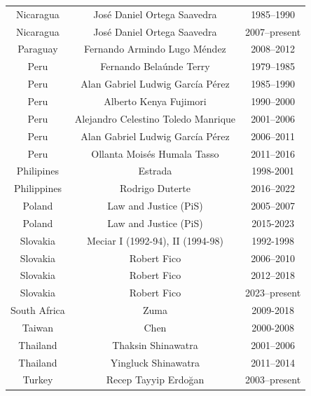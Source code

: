 \documentclass{OUP-EJ}
\begin{document}
\begin{table}[h]
{\begin{tabular}{|c|c|c|}
Nicaragua    & José Daniel Ortega Saavedra                   & 1985–1990    \\
Nicaragua    & José Daniel Ortega Saavedra                   & 2007–present \\
Paraguay     & Fernando Armindo Lugo Méndez                  & 2008–2012    \\
Peru         & Fernando Belaúnde Terry                       & 1979–1985    \\
Peru         & Alan Gabriel Ludwig García Pérez              & 1985–1990    \\
Peru         & Alberto Kenya Fujimori                        & 1990–2000    \\
Peru         & Alejandro Celestino Toledo Manrique           & 2001–2006    \\
Peru         & Alan Gabriel Ludwig García Pérez              & 2006–2011    \\
Peru         & Ollanta Moisés Humala Tasso                   & 2011–2016    \\
Philipines   & Estrada                                       & 1998-2001    \\
Philippines  & Rodrigo Duterte                               & 2016–2022    \\
Poland       & Law and Justice (PiS)                         & 2005–2007    \\
Poland       & Law and Justice (PiS)                         & 2015-2023    \\
Slovakia     & Meciar I (1992-94), II (1994-98)              & 1992-1998    \\
Slovakia     & Robert Fico                                   & 2006–2010    \\
Slovakia     & Robert Fico                                   & 2012–2018    \\
Slovakia     & Robert Fico                                   & 2023–present \\
South Africa & Zuma                                          & 2009-2018    \\
Taiwan       & Chen                                          & 2000-2008    \\
Thailand     & Thaksin Shinawatra                            & 2001–2006    \\
Thailand     & Yingluck Shinawatra                           & 2011–2014    \\
Turkey       & Recep Tayyip Erdoğan                          & 2003–present \\

\end{tabular}}
\end{table}
\end{document}
